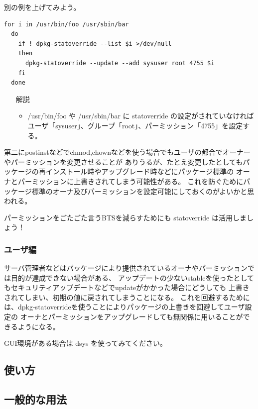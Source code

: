 \documentclass[mingoth,a4paper]{jsarticle}
\begin{document}
  別の例を上げてみよう。

  \begin{Verbatim}[frame=single]
  for i in /usr/bin/foo /usr/sbin/bar
  do
    if ! dpkg-statoverride --list $i >/dev/null
    then
      dpkg-statoverride --update --add sysuser root 4755 $i
    fi
  done
  \end{Verbatim}

  \begin{itemize}
    \item [解説] 
    \begin{itemize}
      \item /usr/bin/foo や /usr/sbin/bar に statoverride の設定がされていなければ
            ユーザ「sysuser」、グループ「root」、パーミッション「4755」を設定する。
    \end{itemize}
  \end{itemize}

  第二にpostinstなどでchmod,chownなどを使う場合でもユーザの都合でオーナーやパーミッションを変更させることが
  ありうるが、たとえ変更したとしてもパッケージの再インストール時やアップグレード時などにパッケージ標準の
  オーナとパーミッションに上書きされてしまう可能性がある。
  これを防ぐためにパッケージ標準のオーナ及びパーミッションを設定可能にしておくのがよいかと思われる。

  パーミッションをごたごた言うBTSを減らすためにも statoverride は活用しましょう！

  \subsubsection{ユーザ編}

  サーバ管理者などはパッケージにより提供されているオーナやパーミッションでは目的が達成できない場合がある、
  アップデートの少ないstableを使ったとしてもセキュリティアップデートなどでupdateがかかった場合にどうしても
  上書きされてしまい、初期の値に戻されてしまうことになる。
  これを回避するためには、dpkg-statoverrideを使うことによりパッケージの上書きを回避してユーザ設定の
  オーナとパーミッションをアップグレードしても無関係に用いることができるようになる。
  
  GUI環境がある場合は dsys を使ってみてください。

\subsection{使い方}

  \subsection{一般的な用法}
\end{document}
